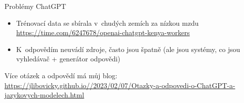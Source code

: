 \documentclass[aspectratio=169,dvipsnames]{beamer}
\begin{document}

\begin{frame}{Problémy ChatGPT}

    \begin{itemize}

        \item Trénovací data se sbírala v~chudých zemích za nízkou mzdu {\tiny \\
            \url{https://time.com/6247678/openai-chatgpt-kenya-workers}}

		\item K~odpovědím neuvádí zdroje, často jsou špatně (ale jsou systémy,
				co jsou vyhledávač + generátor odpovědi)

    \end{itemize}

    \vspace{10pt}

    Více otázek a odpovědí má můj blog: \url{https://jlibovicky.github.io//2023/02/07/Otazky-a-odpovedi-o-ChatGPT-a-jazykovych-modelech.html}

\end{frame}




\end{document}
